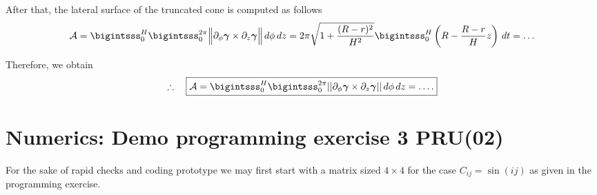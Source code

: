 \documentclass[12pt]{article}
\begin{document}
After that, the lateral surface of the truncated cone 
is computed as follows
\begin{align*}
	\mathcal{A}
	=
	\bigintsss_{0}^H \bigintsss_0^{2 \pi}
	\Big\| 
	\partial_{\phi} \bm{\gamma} \times \partial_z \bm{\gamma}
	\Big\|
	\, d\phi \, dz                            
	= 2 \pi \sqrt{1 + \frac{(R-r)^2}{H^2}}
	\bigintsss_{0}^H \left(R - \frac{R-r}{H}z\right) \, dt = \dots
\end{align*}

Therefore, we obtain
\begin{align*}
	\therefore\quad\boxed{
		\mathcal{A} =
		\bigintsss_{0}^H \bigintsss_0^{2 \pi}
		||\partial_{\phi} \bm{\gamma} \times \partial_z \bm{\gamma} || \, d\phi \, dz
		= \dots.
	}
\end{align*}
\clearpage
\section{Numerics: Demo programming exercise 3 PRU(02)}
\begin{observationboxed}
	For the sake of rapid checks and coding prototype
	we may first start with a matrix sized $4\times 4$
	for the case $C_{ij}=\sin(ij)$ as given in the programming exercise.
\end{observationboxed}


% 
\end{document}
